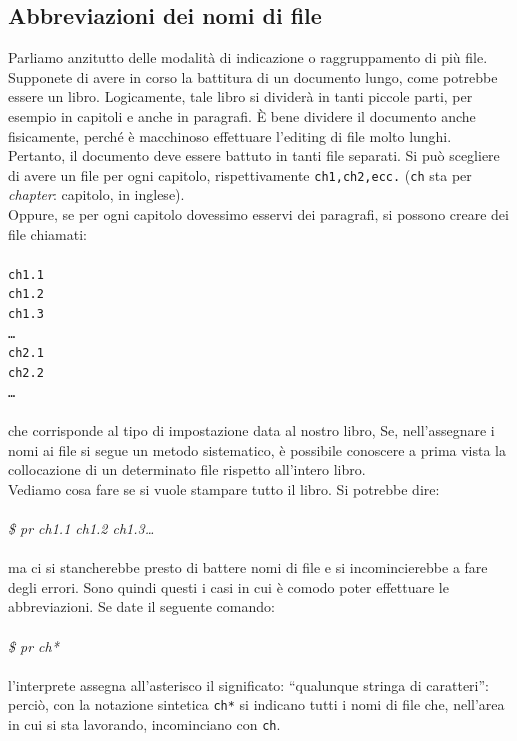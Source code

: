 \subsection{Abbreviazioni dei nomi di file}
Parliamo anzitutto delle modalità di indicazione o raggruppamento di più file.
Supponete di avere in corso la battitura di un documento lungo, come potrebbe
essere un libro. Logicamente, tale libro si dividerà in tanti piccole parti,
per esempio in capitoli e anche in paragrafi. È bene dividere il documento
anche fisicamente, perché è macchinoso effettuare l'editing di file molto
lunghi. Pertanto, il documento deve essere battuto in tanti file separati. Si
può scegliere di avere un file per ogni capitolo, rispettivamente
\texttt{ch1,ch2,ecc.} (\texttt{ch} sta per \textit{chapter}: capitolo, in
inglese).\\ 
Oppure, se per ogni capitolo dovessimo esservi dei paragrafi, si possono creare
dei file chiamati:\\\\
{\tt ch1.1\\ ch1.2\\ ch1.3 \\ \dots\\ ch2.1\\ ch2.2\\ \dots}\\\\
che corrisponde al tipo di impostazione data al nostro libro, Se,
nell'assegnare i nomi ai file si segue un metodo sistematico, è possibile
conoscere a prima vista la collocazione di un determinato file rispetto
all'intero libro.\\
Vediamo cosa fare se si vuole stampare tutto il libro. Si potrebbe dire:\\\\
\textit{\$ pr ch1.1 ch1.2 ch1.3\dots}\\\\
ma ci si stancherebbe presto di battere nomi di file e si incomincierebbe a
fare degli errori. Sono quindi questi i casi in cui è comodo poter effettuare
le abbreviazioni. Se date il seguente comando:\\\\
\textit{\$ pr ch*}\\\\
l'interprete assegna all'asterisco il significato: ``qualunque stringa di
caratteri'': perciò, con la notazione sintetica \texttt{ch*} si indicano tutti
i nomi di file che, nell'area in cui si sta lavorando, incominciano con
\texttt{ch}.\\
